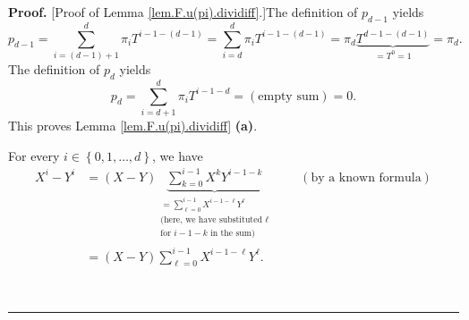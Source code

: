 \documentclass[numbers=enddot,12pt,final,onecolumn,notitlepage]{scrartcl}%
\theoremstyle{definition}
\newenvironment{proof}[1][Proof]{\noindent\textbf{#1.} }{\ \rule{0.5em}{0.5em}}
\let\sumnonlimits\sum
\renewcommand{\sum}{\sumnonlimits\limits}
\begin{document}
\begin{proof}
[Proof of Lemma \ref{lem.F.u(pi).dividiff}.]The definition of $p_{d-1}$ yields%
\[
p_{d-1}=\sum_{i=\left(  d-1\right)  +1}^{d}\pi_{i}T^{i-1-\left(  d-1\right)
}=\sum_{i=d}^{d}\pi_{i}T^{i-1-\left(  d-1\right)  }=\pi_{d}%
\underbrace{T^{d-1-\left(  d-1\right)  }}_{=T^{0}=1}=\pi_{d}.
\]
The definition of $p_{d}$ yields%
\[
p_{d}=\sum_{i=d+1}^{d}\pi_{i}T^{i-1-d}=\left(  \text{empty sum}\right)  =0.
\]
This proves Lemma \ref{lem.F.u(pi).dividiff} \textbf{(a)}.

For every $i\in\left\{  0,1,\ldots,d\right\}  $, we have%
\begin{align}
X^{i}-Y^{i}  &  =\left(  X-Y\right)  \underbrace{\sum_{k=0}^{i-1}%
X^{k}Y^{i-1-k}}_{\substack{=\sum_{\ell=0}^{i-1}X^{i-1-\ell}Y^{\ell
}\\\text{(here, we have substituted }\ell\\\text{for }i-1-k\text{ in the
sum)}}}\ \ \ \ \ \ \ \ \ \ \left(  \text{by a known formula}\right)
\nonumber\\
&  =\left(  X-Y\right)  \sum_{\ell=0}^{i-1}X^{i-1-\ell}Y^{\ell}.
\label{pf.lem.F.u(pi).dividiff.geoser}%
\end{align}



\end{proof}
\end{document}
